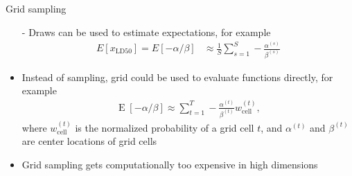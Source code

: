 \documentclass[finnish,english,t]{beamer}
\DeclareMathOperator{\E}{E}
\begin{document}
\begin{frame}{Grid sampling}

  \begin{itemize}
  \item[-] Draws can be used to estimate expectations, for example
    \begin{align*}
      E[x_{\mathrm{LD50}}] = E[-\alpha/\beta] & \approx \frac{1}{S}\sum_{s=1}^{S} -\frac{\alpha^{(s)}}{\beta^{(s)}}
    \end{align*}
  \item<2->[-] Instead of sampling, grid could be used to evaluate
    functions directly, for example
    \begin{align*}
      \E[-\alpha/\beta] \approx \sum_{t=1}^{T} -\frac{\alpha^{(t)}}{\beta^{(t)}}w_{\mathrm{cell}}^{(t)} ,
    \end{align*}
    where $w_{\mathrm{cell}}^{(t)}$ is the normalized probability of a grid cell $t$, and $\alpha^{(t)}$ and $\beta^{(t)}$ are center locations of grid cells
  \item<3-> Grid sampling gets computationally too expensive in high
    dimensions
  \end{itemize}

\end{frame}
\end{document}
